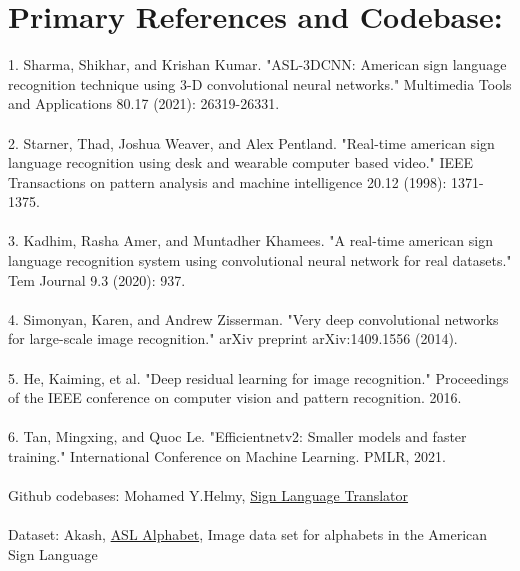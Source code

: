 \documentclass{article}
\begin{document}
\section{Primary References and Codebase:}
1. Sharma, Shikhar, and Krishan Kumar. "ASL-3DCNN: American sign language recognition technique using 3-D convolutional neural networks." Multimedia Tools and Applications 80.17 (2021): 26319-26331.\\ \\
2. Starner, Thad, Joshua Weaver, and Alex Pentland. "Real-time american sign language recognition using desk and wearable computer based video." IEEE Transactions on pattern analysis and machine intelligence 20.12 (1998): 1371-1375.\\ \\
3. Kadhim, Rasha Amer, and Muntadher Khamees. "A real-time american sign language recognition system using convolutional neural network for real datasets." Tem Journal 9.3 (2020): 937.\\ \\
4. Simonyan, Karen, and Andrew Zisserman. "Very deep convolutional networks for large-scale image recognition." arXiv preprint arXiv:1409.1556 (2014).\\ \\
5. He, Kaiming, et al. "Deep residual learning for image recognition." Proceedings of the IEEE conference on computer vision and pattern recognition. 2016.\\ \\
6. Tan, Mingxing, and Quoc Le. "Efficientnetv2: Smaller models and faster training." International Conference on Machine Learning. PMLR, 2021.\\ \\
Github codebases: Mohamed Y.Helmy, \href{https://github.com/Mohamedyasserhelmy/Sign-Language-Translator-ASL}{Sign Language Translator} \\ \\
Dataset: Akash, \href{https://www.kaggle.com/datasets/grassknoted/asl-alphabet/code}{ASL Alphabet}, 
Image data set for alphabets in the American Sign Language
\end{document}
